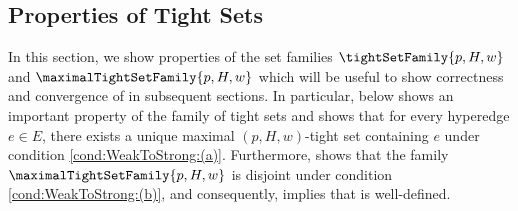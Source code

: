 \begin{algorithm}[!h]
\begin{algorithmic}[1]
    \label{alg:WeakToStrongCover:(11)}
    
    \label{alg:WeakToStrongCover:(12)}
    \label{alg:WeakToStrongCover:(13)}
    
    \label{alg:WeakToStrongCover:(14)}
    
    \label{alg:WeakToStrongCover:(15)}
    
    \label{alg:WeakToStrongCover:(16)}
    \EndIf
\end{algorithmic}
\end{algorithm}

\subsection{Properties of Tight Sets}\label{sec:WeakToStrongCover:UncrossingProperties}
In this section, we show properties of the set families $\tightSetFamily{p, H, w}$ and $\maximalTightSetFamily{p, H, w}$ which will be useful to show correctness and convergence of  in subsequent sections.
In particular,  below shows an important property of the family of tight sets and  shows that for every hyperedge $e\in E$, there exists a unique maximal $(p, H, w)$-tight set containing $e$ under condition \ref{cond:WeakToStrong:(a)}. Furthermore,  shows that the family $\maximalTightSetFamily{p, H, w}$ is disjoint under condition \ref{cond:WeakToStrong:(b)}, and consequently,  implies  that   is well-defined.

